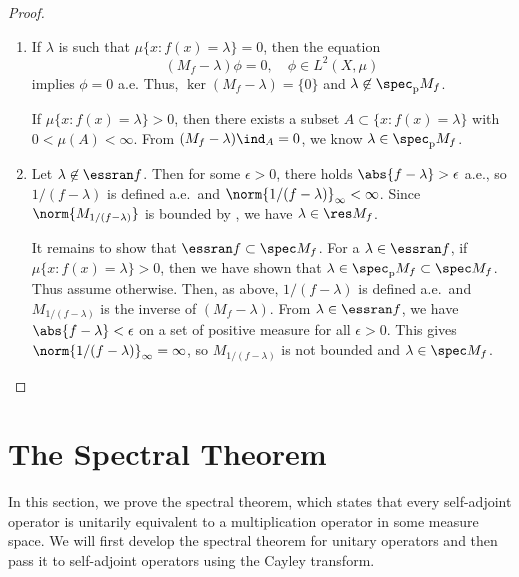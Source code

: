 \documentclass[oneside,reqno,letterpaper]{amsart}
\newcommand{\pspec}{\spec_{\mathrm{p}}}
\begin{document}
\begin{proof}~
\begin{enumerate}[label=(\alph*)]
  \item %
  If \(\lambda\) is such that \(\mu \{x: f(x) = \lambda\} = 0\), then the equation
  \[
    (M_f - \lambda) \phi = 0, \quad \phi \in L^2(X, \mu)
  \] 
  implies \(\phi = 0\) a.e.
  Thus, \(\ker(M_f - \lambda) = \{0\}\) and \(\lambda \not\in \pspec M_f\). 

  If \(\mu \{x: f(x) = \lambda\} > 0\), then there exists a subset \(A \subset \{x: f(x) = \lambda\}\) with \(0 < \mu(A) < \infty\). 
  From \((M_f - \lambda) \ind_{A} = 0\), we know \(\lambda \in \pspec M_f\). 

  \item %
  Let \(\lambda \not\in \essran f\). 
  Then for some \(\epsilon > 0\), there holds \(\abs{f - \lambda} > \epsilon\) a.e., 
    so \(1 / (f - \lambda)\) is defined a.e.\ and \(\norm{1 / (f - \lambda)}_{\infty} < \infty\). 
  Since \(\norm{M_{1 / (f - \lambda)}}\) is bounded by , we have \(\lambda \in \res M_f\). 

  It remains to show that \(\essran f \subset \spec M_f\). 
  For a \(\lambda \in \essran f\), if \(\mu \{x: f(x) = \lambda\} > 0\), then we have shown that \(\lambda \in \pspec M_f \subset \spec M_f\). 
  Thus assume otherwise. 
  Then, as above, \(1 / (f - \lambda)\) is defined a.e.\ and \(M_{1 / (f - \lambda)}\) is the inverse of \((M_f - \lambda)\). 
  From \(\lambda \in \essran f\), we have \(\abs{f - \lambda} < \epsilon\) on a set of positive measure for all \(\epsilon > 0\). 
  This gives \(\norm{1 / (f - \lambda)}_{\infty} = \infty\), 
  so \(M_{1 / (f - \lambda)}\) is not bounded and \(\lambda \in \spec M_f\). 
\end{enumerate}
\end{proof}



\section{The Spectral Theorem}
\label{sec:spectral-thm}

In this section, we prove the spectral theorem, which states that every self-adjoint operator is unitarily equivalent to a multiplication operator in some measure space. 
We will first develop the spectral theorem for unitary operators and then pass it to self-adjoint operators using the Cayley transform.
\end{document}
